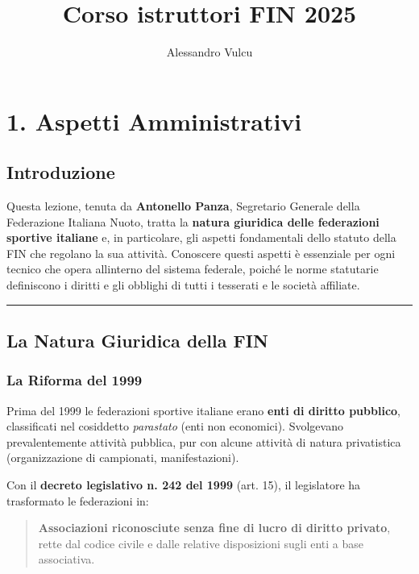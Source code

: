 \documentclass[a4paper,11pt]{article}
\title{Corso istruttori FIN 2025}
\author{Alessandro Vulcu}
\date{}
\begin{document}
\maketitle

\section{1. Aspetti Amministrativi}\label{aspetti-amministrativi}

\subsection{Introduzione}\label{introduzione}

Questa lezione, tenuta da \textbf{Antonello Panza}, Segretario Generale
della Federazione Italiana Nuoto, tratta la \textbf{natura giuridica
      delle federazioni sportive italiane} e, in particolare, gli aspetti
fondamentali dello statuto della FIN che regolano la sua attività.
Conoscere questi aspetti è essenziale per ogni tecnico che opera
all\textquotesingle interno del sistema federale, poiché le norme
statutarie definiscono i diritti e gli obblighi di tutti i tesserati e
le società affiliate.

\begin{center}\rule{0.5\linewidth}{0.5pt}\end{center}

\subsection{La Natura Giuridica della
      FIN}\label{la-natura-giuridica-della-fin}

\subsubsection{La Riforma del 1999}\label{la-riforma-del-1999}

Prima del 1999 le federazioni sportive italiane erano \textbf{enti di
      diritto pubblico}, classificati nel cosiddetto \emph{parastato} (enti
non economici). Svolgevano prevalentemente attività pubblica, pur con
alcune attività di natura privatistica (organizzazione di campionati,
manifestazioni).

Con il \textbf{decreto legislativo n. 242 del 1999} (art. 15), il
legislatore ha trasformato le federazioni in:

\begin{quote}
      \textbf{Associazioni riconosciute senza fine di lucro di diritto
            privato}, rette dal codice civile e dalle relative disposizioni sugli
      enti a base associativa.
\end{quote}
\end{document}

